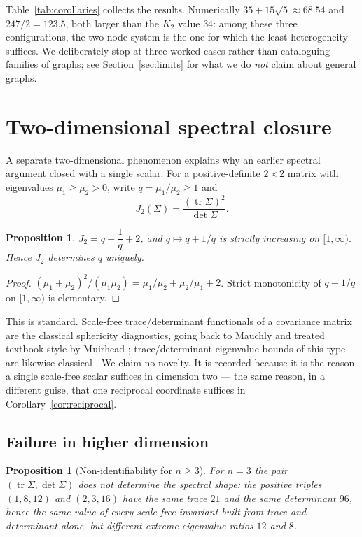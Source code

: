 \documentclass[11pt]{article}
\theoremstyle{plain}
\newtheorem{proposition}[theorem]{Proposition}
\theoremstyle{definition}
\theoremstyle{remark}
\newcommand{\tr}{\operatorname{tr}}
\newcommand{\Sig}{\Sigma}
\begin{document}
Table~\ref{tab:corollaries} collects the results. Numerically $35+15\sqrt5\approx68.54$ and
$247/2=123.5$, both larger than the $K_2$ value $34$: among these three configurations, the
two-node system is the one for which the least heterogeneity suffices. We deliberately stop at
three worked cases rather than cataloguing families of graphs; see Section~\ref{sec:limits} for
what we do \emph{not} claim about general graphs.

\section{Two-dimensional spectral closure}\label{sec:closure}

A separate two-dimensional phenomenon explains why an earlier spectral argument closed with a
single scalar. For a positive-definite $2\times2$ matrix with eigenvalues $\mu_1\ge\mu_2>0$,
write $q=\mu_1/\mu_2\ge1$ and
\begin{equation}
  J_2(\Sig)=\frac{(\tr\Sig)^2}{\det\Sig}. \label{eq:J2}
\end{equation}

\begin{proposition}\label{prop:J2}
$J_2=q+\dfrac1q+2$, and $q\mapsto q+1/q$ is strictly increasing on $[1,\infty)$. Hence $J_2$
determines $q$ uniquely.
\end{proposition}

\begin{proof}
$(\mu_1+\mu_2)^2/(\mu_1\mu_2)=\mu_1/\mu_2+\mu_2/\mu_1+2$. Strict monotonicity of $q+1/q$ on
$[1,\infty)$ is elementary.
\end{proof}

This is standard. Scale-free trace/determinant functionals of a covariance matrix are the
classical sphericity diagnostics, going back to Mauchly \cite{Mauchly1940} and treated
textbook-style by Muirhead \cite[Ch.~8]{Muirhead1982}; trace/determinant eigenvalue bounds of this
type are likewise classical \cite{WolkowiczStyan1980,HornJohnson2012}. We claim no novelty. It is recorded because
it is the reason a single scale-free scalar suffices in dimension two --- the same reason, in a
different guise, that one reciprocal coordinate suffices in Corollary~\ref{cor:reciprocal}.

\subsection{Failure in higher dimension}\label{sec:obstruction}

\begin{proposition}[Non-identifiability for $n\ge3$]\label{prop:obstruction}
For $n=3$ the pair $(\tr\Sig,\det\Sig)$ does not determine the spectral shape: the positive
triples $(1,8,12)$ and $(2,3,16)$ have the same trace $21$ and the same determinant $96$, hence
the same value of every scale-free invariant built from trace and determinant alone, but
different extreme-eigenvalue ratios $12$ and $8$.
\end{proposition}
\end{document}
